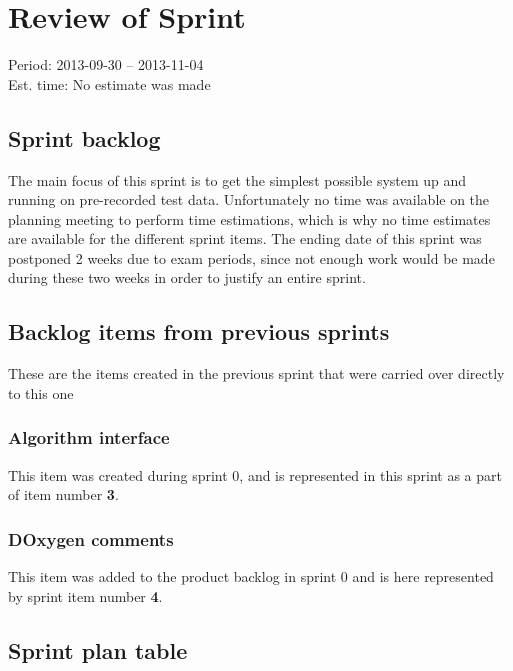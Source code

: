 \section{Review of Sprint \sprintnum}
\label{sec:sprint1}
\large Period: 2013-09-30 -- 2013-11-04 \\ 
\large Est. time: No estimate was made

\subsection{Sprint backlog}
The main focus of this sprint is to get the simplest possible system up and running on pre-recorded test data. Unfortunately no time was available on the planning meeting to perform time estimations, which is why no time estimates are available for the different sprint items. The ending date of this sprint was postponed 2 weeks due to exam periods, since not enough work would be made during these two weeks in order to justify an entire sprint.

\subsection{Backlog items from previous sprints}
These are the items created in the previous sprint that were carried over directly to this one

\subsubsection{Algorithm interface}
This item was created during sprint 0, and is represented in this sprint as a part of item number \textbf{3}.

\subsubsection{DOxygen comments}
This item was added to the product backlog in sprint 0 and is here represented by sprint item number \textbf{4}. 
\newpage

\subsection{Sprint plan table}

